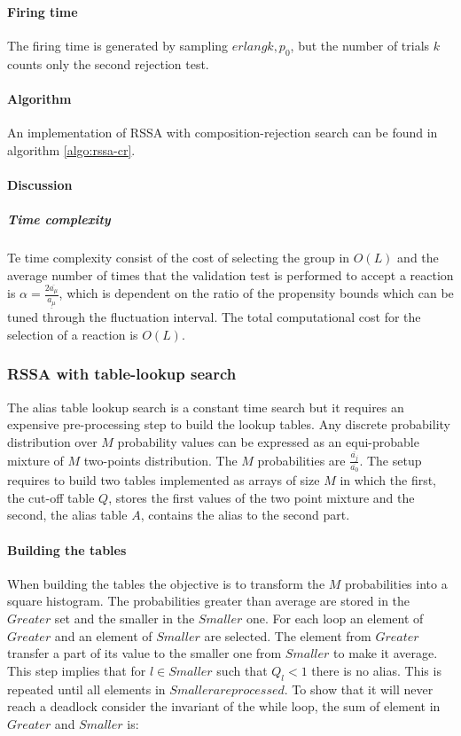       \paragraph{Firing time}
      The firing time is generated by sampling $erlang{k,p_0}$, but the number of trials $k$ counts only the second rejection test.

      \paragraph{Algorithm}
      An implementation of RSSA with composition-rejection search can be found in algorithm \ref{algo:rssa-cr}.

      

      \paragraph{Discussion}

        \subparagraph{Time complexity}
        Te time complexity consist of the cost of selecting the group in $O(L)$ and the average number of times that the validation test is performed to accept a reaction is $\alpha = \frac{2\overline{a_\mu}}{\underline{a_\mu}}$, which is dependent on the ratio of the propensity bounds which can be tuned through the fluctuation interval.
        The total computational cost for the selection of a reaction is $O(L)$.

    \subsubsection{RSSA with table-lookup search}
    The alias table lookup search is a constant time search but it requires an expensive pre-processing step to build the lookup tables.
    Any discrete probability distribution over $M$ probability values can be expressed as an equi-probable mixture of $M$ two-points distribution.
    The $M$ probabilities are $\frac{\overline{a_j}}{\overline{a_0}}$.
    The setup requires to build two tables implemented as arrays of size $M$ in which the first, the cut-off table $Q$, stores the first values of the two point mixture and the second, the alias table $A$, contains the alias to the second part.

      \paragraph{Building the tables}
      When building the tables the objective is to transform the $M$ probabilities into a square histogram.
      The probabilities greater than average are stored in the $Greater$ set and the smaller in the $Smaller$ one.
      For each loop an element of $Greater$ and an element of $Smaller$ are selected.
      The element from $Greater$ transfer a part of its value to the smaller one from $Smaller$ to make it average.
      This step implies that for $l\in Smaller$ such that $Q_l<1$ there is no alias.
      This is repeated until all elements in $Smaller are processed$.
      To show that it will never reach a deadlock consider the invariant of the while loop, the sum of element in $Greater$ and $Smaller$ is:

